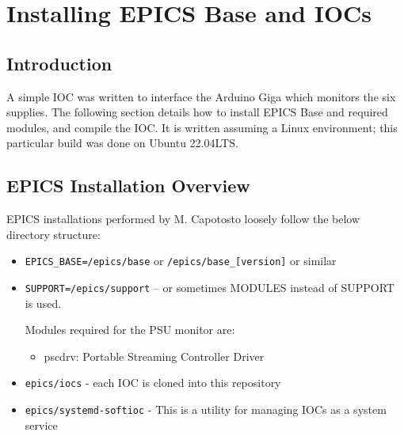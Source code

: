 \chapter{Installing EPICS Base and IOCs}
\label{chap:epics_iocs}

\section{Introduction}
A simple IOC was written to interface the Arduino Giga which monitors the six supplies. The following section details how to install EPICS Base and required modules, and compile the IOC. It is written assuming a Linux environment; this particular build was done on Ubuntu 22.04LTS.

\section{EPICS Installation Overview}
	EPICS installations performed by M. Capotosto loosely follow the below directory structure:

	\begin{itemize}
		\item \texttt{EPICS\_BASE=/epics/base} or \texttt{/epics/base\_[version]} or similar
		\item \texttt{SUPPORT=/epics/support} -- or sometimes MODULES instead of SUPPORT is used.
			\par\bigskip
			\quad Modules required for the PSU monitor are:
			\begin{itemize}[topsep=0pt]
				\item pscdrv: Portable Streaming Controller Driver
			\end{itemize}
		\item \texttt{epics/iocs} - each IOC is cloned into this repository
		\item \texttt{epics/systemd-softioc} - This is a utility for managing IOCs as a system service
	\end{itemize}

